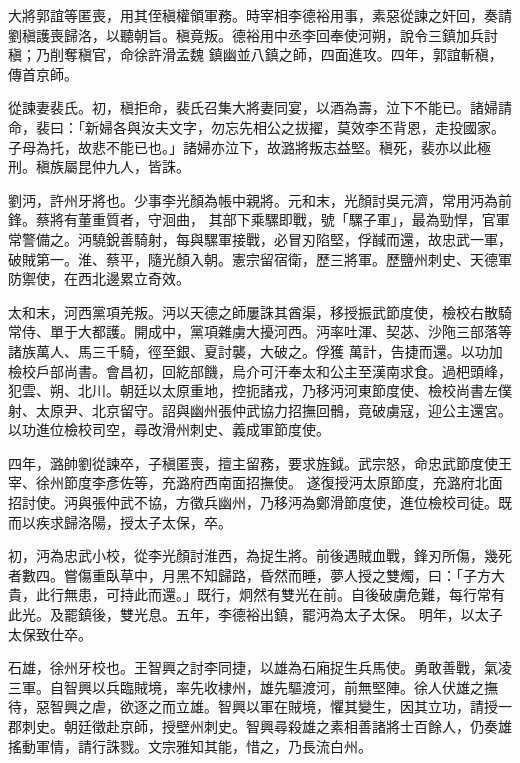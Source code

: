 \begin{pinyinscope}
 大將郭誼等匿喪，用其侄稹權領軍務。時宰相李德裕用事，素惡從諫之奸回，奏請劉稹護喪歸洛，以聽朝旨。稹竟叛。德裕用中丞李回奉使河朔，說令三鎮加兵討稹；乃削奪稹官，命徐許滑孟魏
 鎮幽並八鎮之師，四面進攻。四年，郭誼斬稹，傳首京師。



 從諫妻裴氏。初，稹拒命，裴氏召集大將妻同宴，以酒為壽，泣下不能已。諸婦請命，裴曰：「新婦各與汝夫文字，勿忘先相公之拔擢，莫效李丕背恩，走投國家。子母為托，故悲不能已也。」諸婦亦泣下，故潞將叛志益堅。稹死，裴亦以此極刑。稹族屬昆仲九人，皆誅。



 劉沔，許州牙將也。少事李光顏為帳中親將。元和末，光顏討吳元濟，常用沔為前鋒。蔡將有董重質者，守洄曲，
 其部下乘騾即戰，號「騾子軍」，最為勁悍，官軍常警備之。沔驍銳善騎射，每與騾軍接戰，必冒刃陷堅，俘馘而還，故忠武一軍，破賊第一。淮、蔡平，隨光顏入朝。憲宗留宿衛，歷三將軍。歷鹽州刺史、天德軍防禦使，在西北邊累立奇效。



 太和末，河西黨項羌叛。沔以天德之師屢誅其酋渠，移授振武節度使，檢校右散騎常侍、單于大都護。開成中，黨項雜虜大擾河西。沔率吐渾、契苾、沙陁三部落等諸族萬人、馬三千騎，徑至銀、夏討襲，大破之。俘獲
 萬計，告捷而還。以功加檢校戶部尚書。會昌初，回紇部饑，烏介可汗奉太和公主至漢南求食。過杷頭峰，犯雲、朔、北川。朝廷以太原重地，控扼諸戎，乃移沔河東節度使、檢校尚書左僕射、太原尹、北京留守。詔與幽州張仲武協力招撫回鶻，竟破虜寇，迎公主還宮。以功進位檢校司空，尋改滑州刺史、義成軍節度使。



 四年，潞帥劉從諫卒，子稹匿喪，擅主留務，要求旌鉞。武宗怒，命忠武節度使王宰、徐州節度李彥佐等，充潞府西南面招撫使。
 遂復授沔太原節度，充潞府北面招討使。沔與張仲武不協，方徵兵幽州，乃移沔為鄭滑節度使，進位檢校司徒。既而以疾求歸洛陽，授太子太保，卒。



 初，沔為忠武小校，從李光顏討淮西，為捉生將。前後遇賊血戰，鋒刃所傷，幾死者數四。嘗傷重臥草中，月黑不知歸路，昏然而睡，夢人授之雙燭，曰：「子方大貴，此行無患，可持此而還。」既行，炯然有雙光在前。自後破虜危難，每行常有此光。及罷鎮後，雙光息。五年，李德裕出鎮，罷沔為太子太保。
 明年，以太子太保致仕卒。



 石雄，徐州牙校也。王智興之討李同捷，以雄為石廂捉生兵馬使。勇敢善戰，氣凌三軍。自智興以兵臨賊境，率先收棣州，雄先驅渡河，前無堅陣。徐人伏雄之撫待，惡智興之虐，欲逐之而立雄。智興以軍在賊境，懼其變生，因其立功，請授一郡刺史。朝廷徵赴京師，授壁州刺史。智興尋殺雄之素相善諸將士百餘人，仍奏雄搖動軍情，請行誅戮。文宗雅知其能，惜之，乃長流白州。




\end{pinyinscope}
